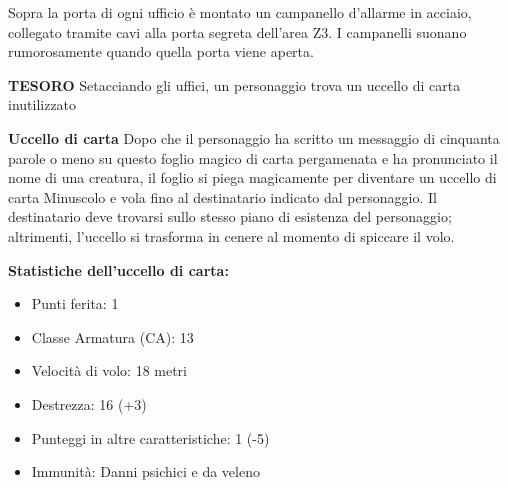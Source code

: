 \documentclass{article}
\begin{document}
Sopra la porta di ogni ufficio è montato un campanello d'allarme in acciaio, collegato tramite cavi alla porta segreta dell'area Z3. I campanelli suonano rumorosamente quando quella porta viene aperta.

\textbf{TESORO}
Setacciando gli uffici, un personaggio trova un uccello di carta inutilizzato

\textbf{Uccello di carta}
Dopo che il personaggio ha scritto un messaggio di cinquanta parole o meno su questo foglio magico di carta pergamenata e ha pronunciato il nome di una creatura, il foglio si piega magicamente per diventare un uccello di carta Minuscolo e vola fino al destinatario indicato dal personaggio. Il destinatario deve trovarsi sullo stesso piano di esistenza del personaggio; altrimenti, l'uccello si trasforma in cenere al momento di spiccare il volo.

\textbf{Statistiche dell'uccello di carta:}
\begin{itemize}
    \item Punti ferita: 1
    \item Classe Armatura (CA): 13
    \item Velocità di volo: 18 metri
    \item Destrezza: 16 (+3)
    \item Punteggi in altre caratteristiche: 1 (-5)
    \item Immunità: Danni psichici e da veleno
\end{itemize}
\end{document}

